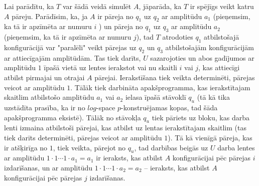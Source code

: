 \documentclass{ludis}
\begin{document}
Lai parādītu, ka $T$ var šādā veidā simulēt $A$, jāparāda, ka $T$ ir spējīgs veikt katru $A$ pāreju. Parādīsim, ka, ja $A$ ir pāreja no $q_1$ uz $q_2$ ar amplitūdu $a_1$ (pieņemsim, ka tā ir apzīmēta ar numuru $i$ ) un pāreja no $q_1$ uz $q_3$ ar amplitūdu $a_2$ (pieņemsim, ka tā ir apzīmēta ar numuru $j$), tad $T$ atrodoties $q_1$ atbilstošajā konfigurācijā var "paralēli" veikt pārejas uz $q_2$ un $q_3$ atbilstošajām konfigurācijām ar attiecīgajām amplitūdām. Tas tiek darīts, $U$ sazarojoties un abos gadījumos ar amplitūdu $1$ īpašā vietā uz lentes ierakstot vai nu skaitli $i$ vai $j$, kas attiecīgi atbilst pirmajai un otrajai $A$ pārejai. Ierakstīšana tiek veikta determinēti, pārejas veicot ar amplitūdu $1$. Tālāk tiek darbināta apakšprogramma, kas ierakstītajam skaitlim atbilstošo amplitūdu $a_1$ vai $a_2$ ielasa īpašā stāvoklī $q_u$ (tā kā tika uzstādīta prasība, ka ir no $log$-space $p$-konstruējamas kopas, tad šāda apakšprogramma eksistē). Tālāk no stāvokļa $q_u$ tiek pāriets uz bloku, kas darba lenti izmaina atbilstoši pārejai, kas atbilst uz lentas ierakstītajam skaitlim (tas tiek darīts determinēti, pārejas veicot ar amplitūdu $1$). Tā kā vienīgā pāreja, kas ir atšķirīga no $1$, tiek veikta, pārejot no $q_u$, tad darbības beigās uz $U$ darba lentes ar amplitūdu $1 \cdot 1 \cdots 1 \cdot a_1 = a_1$ ir ieraksts, kas atbilst $A$ konfigurācijai pēc pārejas $i$ izdarīšanas, un ar amplitūdu $1 \cdot 1 \cdots 1 \cdot a_2 = a_2$ -- ieraksts, kas atbilst $A$ konfigurācijai pēc pārejas $j$ izdarīšanas.
\end{document}
